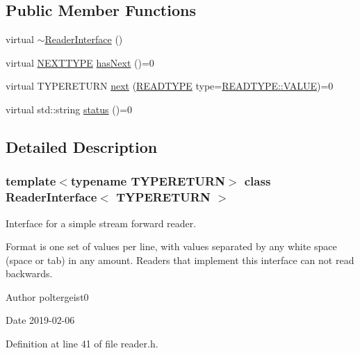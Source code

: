 \subsection*{Public Member Functions}
\begin{DoxyCompactItemize}
\item 
virtual \hyperlink{classReaderInterface_a76b0a42faf97cb747ca81f2fee307ef4}{$\sim$\+Reader\+Interface} ()
\item 
virtual \hyperlink{classReaderInterface_ac2420ec8d2f60feadf2533d4fa77ec5e}{N\+E\+X\+T\+T\+Y\+PE} \hyperlink{classReaderInterface_aeb39a897efaaeb0c4ada7fce47f06f83}{has\+Next} ()=0
\item 
virtual T\+Y\+P\+E\+R\+E\+T\+U\+RN \hyperlink{classReaderInterface_a3f28e135128822544a09a475d2140094}{next} (\hyperlink{classReaderInterface_a1e3610c289ae058a246de41154d8a266}{R\+E\+A\+D\+T\+Y\+PE} type=\hyperlink{classReaderInterface_a1e3610c289ae058a246de41154d8a266aecc2e9c313faddb07e7da223c1dc5c3f}{R\+E\+A\+D\+T\+Y\+P\+E\+::\+V\+A\+L\+UE})=0
\item 
virtual std\+::string \hyperlink{classReaderInterface_a5f86ed49eac808ed0a912f7d670c4042}{status} ()=0
\end{DoxyCompactItemize}


\subsection{Detailed Description}
\subsubsection*{template$<$typename T\+Y\+P\+E\+R\+E\+T\+U\+RN$>$\newline
class Reader\+Interface$<$ T\+Y\+P\+E\+R\+E\+T\+U\+R\+N $>$}

Interface for a simple stream forward reader. 

Format is one set of values per line, with values separated by any white space (space or tab) in any amount. Readers that implement this interface can not read backwards.

\begin{DoxyAuthor}{Author}
poltergeist0
\end{DoxyAuthor}
\begin{DoxyDate}{Date}
2019-\/02-\/06 
\end{DoxyDate}


Definition at line 41 of file reader.\+h.



